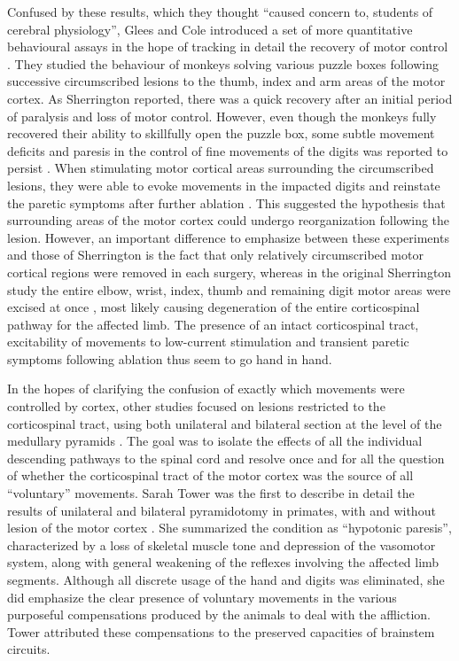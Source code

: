 Confused by these results, which they thought ``caused concern to, students of cerebral physiology'', Glees and Cole introduced a set of more quantitative behavioural assays in the hope of tracking in detail the recovery of motor control \citep{Glees1950,Cole1952}. They studied the behaviour of monkeys solving various puzzle boxes following successive circumscribed lesions to the thumb, index and arm areas of the motor cortex. As Sherrington reported, there was a quick recovery after an initial period of paralysis and loss of motor control. However, even though the monkeys fully recovered their ability to skillfully open the puzzle box, some subtle movement deficits and paresis in the control of fine movements of the digits was reported to persist \citep{Glees1950}. When stimulating motor cortical areas surrounding the circumscribed lesions, they were able to evoke movements in the impacted digits and reinstate the paretic symptoms after further ablation \citep{Glees1950}. This suggested the hypothesis that surrounding areas of the motor cortex could undergo reorganization following the lesion. However, an important difference to emphasize between these experiments and those of Sherrington is the fact that only relatively circumscribed motor cortical regions were removed in each surgery, whereas in the original Sherrington study the entire elbow, wrist, index, thumb and remaining digit motor areas were excised at once \citep{Leyton1917}, most likely causing degeneration of the entire corticospinal pathway for the affected limb. The presence of an intact corticospinal tract, excitability of movements to low-current stimulation and transient paretic symptoms following ablation thus seem to go hand in hand.

In the hopes of clarifying the confusion of exactly which movements were controlled by cortex, other studies focused on lesions restricted to the corticospinal tract, using both unilateral and bilateral section at the level of the medullary pyramids \citep{Tower1940,Lawrence1968,Lawrence1968a}. The goal was to isolate the effects of all the individual descending pathways to the spinal cord and resolve once and for all the question of whether the corticospinal tract of the motor cortex was the source of all ``voluntary'' movements. Sarah Tower was the first to describe in detail the results of unilateral and bilateral pyramidotomy in primates, with and without lesion of the motor cortex \citep{Tower1940}. She summarized the condition as ``hypotonic paresis'', characterized by a loss of skeletal muscle tone and depression of the vasomotor system, along with general weakening of the reflexes involving the affected limb segments. Although all discrete usage of the hand and digits was eliminated, she did emphasize the clear presence of voluntary movements in the various purposeful compensations produced by the animals to deal with the affliction. Tower attributed these compensations to the preserved capacities of brainstem circuits.

